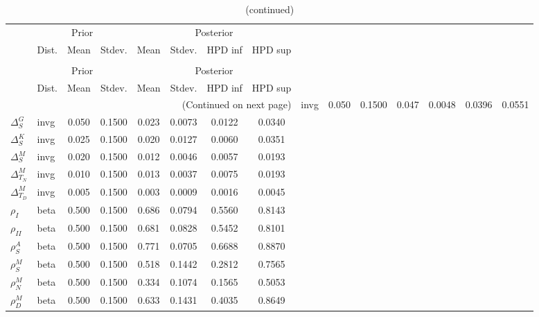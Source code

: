  
\begin{center}
\begin{longtable}{llcccccc} 
\caption{Results from Metropolis-Hastings (parameters)}
 \label{Table:MHPosterior:1}\\
\toprule 
  & \multicolumn{3}{c}{Prior}  &  \multicolumn{4}{c}{Posterior} \\
  \cmidrule(r{.75em}){2-4} \cmidrule(r{.75em}){5-8}
  & Dist. & Mean  & Stdev. & Mean & Stdev. & HPD inf & HPD sup\\
\midrule \endfirsthead 
\caption{(continued)}\\\toprule 
  & \multicolumn{3}{c}{Prior}  &  \multicolumn{4}{c}{Posterior} \\
  \cmidrule(r{.75em}){2-4} \cmidrule(r{.75em}){5-8}
  & Dist. & Mean  & Stdev. & Mean & Stdev. & HPD inf & HPD sup\\
\midrule \endhead 
\bottomrule \multicolumn{8}{r}{(Continued on next page)} \endfoot 
\bottomrule \endlastfoot 
${\Delta^{A}_{S}}$ & invg &   0.050 & 0.1500 &   0.047& 0.0048 &  0.0396 &  0.0551 \\ 
${\Delta^{G}_{S}}$ & invg &   0.050 & 0.1500 &   0.023& 0.0073 &  0.0122 &  0.0340 \\ 
${\Delta^{K}_{S}}$ & invg &   0.025 & 0.1500 &   0.020& 0.0127 &  0.0060 &  0.0351 \\ 
${\Delta^{M}_{S}}$ & invg &   0.020 & 0.1500 &   0.012& 0.0046 &  0.0057 &  0.0193 \\ 
${\Delta^{M}_{T_N}}$ & invg &   0.010 & 0.1500 &   0.013& 0.0037 &  0.0075 &  0.0193 \\ 
${\Delta^{M}_{T_D}}$ & invg &   0.005 & 0.1500 &   0.003& 0.0009 &  0.0016 &  0.0045 \\ 
${\rho_{I}}$ & beta &   0.500 & 0.1500 &   0.686& 0.0794 &  0.5560 &  0.8143 \\ 
${\rho_{II}}$ & beta &   0.500 & 0.1500 &   0.681& 0.0828 &  0.5452 &  0.8101 \\ 
${\rho^{A}_{S}}$ & beta &   0.500 & 0.1500 &   0.771& 0.0705 &  0.6688 &  0.8870 \\ 
${\rho^{M}_{S}}$ & beta &   0.500 & 0.1500 &   0.518& 0.1442 &  0.2812 &  0.7565 \\ 
${\rho^{M}_{N}}$ & beta &   0.500 & 0.1500 &   0.334& 0.1074 &  0.1565 &  0.5053 \\ 
${\rho^{M}_{D}}$ & beta &   0.500 & 0.1500 &   0.633& 0.1431 &  0.4035 &  0.8649 \\ 
\end{longtable}
 \end{center}
